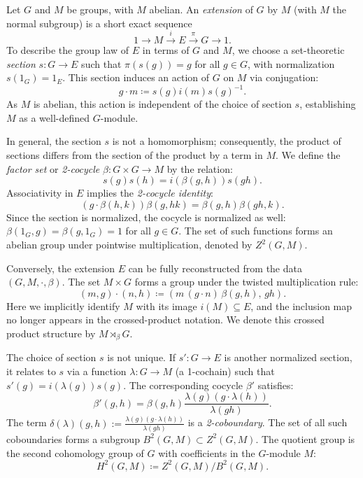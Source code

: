 \documentclass[11pt, reqno]{amsart}
\theoremstyle{definition}
\theoremstyle{remark}
\begin{document}
Let $G$ and $M$ be groups, with $M$ abelian. An \emph{extension} of $G$ by $M$ (with $M$ the normal subgroup) is a short exact sequence
\begin{equation}\label{eq:general-extension}
1 \longrightarrow M \xrightarrow{\; i \;} E \xrightarrow{\; \pi \;} G \longrightarrow 1.
\end{equation}
To describe the group law of $E$ in terms of $G$ and $M$, we choose a set-theoretic \emph{section} $s: G \to E$ such that $\pi(s(g)) = g$ for all $g \in G$, with normalization $s(1_G) = 1_E$.
This section induces an action of $G$ on $M$ via conjugation:
\begin{equation}
g \cdot m \coloneqq s(g) i(m) s(g)^{-1}.
\end{equation}
As $M$ is abelian, this action is independent of the choice of section $s$, establishing $M$ as a well-defined $G$-module.

In general, the section $s$ is not a homomorphism; consequently, the product of sections differs from the section of the product by a term in $M$. We define the \emph{factor set} or \emph{2-cocycle} $\beta: G \times G \to M$ by the relation:
\begin{equation}
s(g)s(h) = i(\beta(g, h)) s(gh).
\end{equation}
Associativity in $E$ implies the \emph{2-cocycle identity}:
\begin{equation}\label{eq:cocycle-identity}
(g \cdot \beta(h, k)) \beta(g, hk) = \beta(g, h) \beta(gh, k).
\end{equation} 
Since the section is normalized, the cocycle is normalized as well: $\beta(1_G,g)=\beta(g,1_G)=1$ for all $g\in G$.
The set of such functions forms an abelian group under pointwise multiplication, denoted by $Z^2(G, M)$.

Conversely, the extension $E$ can be fully reconstructed from the data $(G, M, \cdot, \beta)$. The set $M \times G$ forms a group under the twisted multiplication rule:
\begin{equation}
(m, g) \cdot (n, h) \coloneqq (m \, (g \cdot n) \, \beta(g, h), \, gh).
\end{equation}
Here we implicitly identify $M$ with its image $i(M) \subseteq E$, and the inclusion map no longer appears in the crossed-product notation.
We denote this crossed product structure by $M \rtimes_\beta G$.

The choice of section $s$ is not unique. If $s': G \to E$ is another normalized section, it relates to $s$ via a function $\lambda: G \to M$ (a 1-cochain) such that $s'(g) = i(\lambda(g)) s(g)$. The corresponding cocycle $\beta'$ satisfies:
\begin{equation}
\beta'(g, h) = \beta(g, h) \frac{\lambda(g) (g \cdot \lambda(h))}{\lambda(gh)}.
\end{equation}
The term $\delta(\lambda)(g,h):=\frac{\lambda(g) (g \cdot \lambda(h))}{\lambda(gh)}$ is a \emph{2-coboundary}. The set of all such coboundaries forms a subgroup $B^2(G, M) \subset Z^2(G, M)$. The quotient group is the second cohomology group of $G$ with coefficients in the $G$-module $M$:
\begin{equation}
H^2(G, M) \coloneqq Z^2(G, M) / B^2(G, M).
\end{equation}
\end{document}
